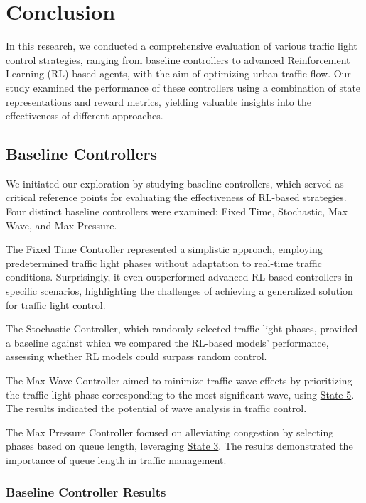 \chapter{Conclusion}

In this research, we conducted a comprehensive evaluation of various traffic light control strategies, ranging from baseline controllers to advanced Reinforcement Learning (RL)-based agents, with the aim of optimizing urban traffic flow. Our study examined the performance of these controllers using a combination of state representations and reward metrics, yielding valuable insights into the effectiveness of different approaches.

\section{Baseline Controllers}

We initiated our exploration by studying baseline controllers, which served as critical reference points for evaluating the effectiveness of RL-based strategies. Four distinct baseline controllers were examined: Fixed Time, Stochastic, Max Wave, and Max Pressure.

The Fixed Time Controller represented a simplistic approach, employing predetermined traffic light phases without adaptation to real-time traffic conditions. Surprisingly, it even outperformed advanced RL-based controllers in specific scenarios, highlighting the challenges of achieving a generalized solution for traffic light control.

The Stochastic Controller, which randomly selected traffic light phases, provided a baseline against which we compared the RL-based models' performance, assessing whether RL models could surpass random control.

The Max Wave Controller aimed to minimize traffic wave effects by prioritizing the traffic light phase corresponding to the most significant wave, using \hyperref[subsec:state-5]{State 5}. The results indicated the potential of wave analysis in traffic control.

The Max Pressure Controller focused on alleviating congestion by selecting phases based on queue length, leveraging \hyperref[subsec:state-3]{State 3}. The results demonstrated the importance of queue length in traffic management.

\subsection{Baseline Controller Results}

